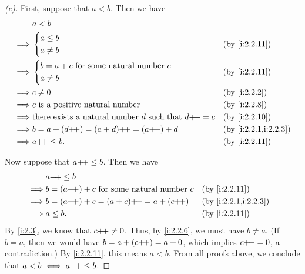 \begin{proof}[(e)]
  First, suppose that \(a < b\).
  Then we have
  \begin{align*}
             & a < b                                                                                         \\
    \implies & \begin{dcases}
                 a \leq b \\
                 a \neq b
               \end{dcases}                                                      &  & \by{i:2.2.11}          \\
    \implies & \begin{dcases}
                 b = a + c \text{ for some natural number } c \\
                 a \neq b
               \end{dcases}                     &  & \by{i:2.2.11}                                           \\
    \implies & c \neq 0                                                            &  & \by{i:2.2.2}         \\
    \implies & c \text{ is a positive natural number}                              &  & \by{i:2.2.8}         \\
    \implies & \text{there exists a natural number } d \text{ such that } d\pp = c &  & \by{i:2.2.10}        \\
    \implies & b = a + (d\pp) = (a + d)\pp = (a\pp) + d                            &  & \by{i:2.2.1,i:2.2.3} \\
    \implies & a\pp \leq b.                                                        &  & \by{i:2.2.11}
  \end{align*}

  Now suppose that \(a{+}\!{+} \leq b\).
  Then we have
  \begin{align*}
             & a\pp \leq b                                                                 \\
    \implies & b = (a\pp) + c \text{ for some natural number } c &  & \by{i:2.2.11}        \\
    \implies & b = (a\pp) + c = (a + c)\pp = a + (c\pp)          &  & \by{i:2.2.1,i:2.2.3} \\
    \implies & a \leq b.                                         &  & \by{i:2.2.11}
  \end{align*}
  By \cref{i:2.3}, we know that \(c{+}\!{+} \neq 0\).
  Thus, by \cref{i:2.2.6}, we must have \(b \neq a\).
  (If \(b = a\), then we would have \(b = a + (c{+}\!{+}) = a + 0\), which implies \(c{+}\!{+} = 0\), a contradiction.)
  By \cref{i:2.2.11}, this means \(a < b\).
  From all proofs above, we conclude that \(a < b \iff a{+}\!{+} \leq b\).
\end{proof}

